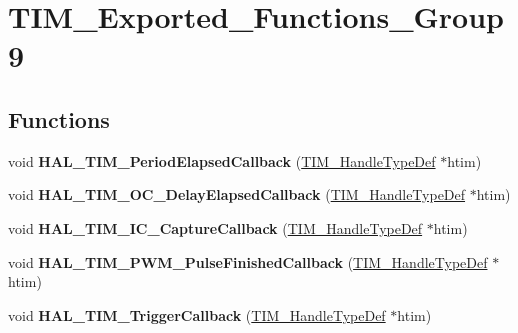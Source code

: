 \hypertarget{group___t_i_m___exported___functions___group9}{\section{T\-I\-M\-\_\-\-Exported\-\_\-\-Functions\-\_\-\-Group9}
\label{group___t_i_m___exported___functions___group9}
}
\subsection*{Functions}
\begin{DoxyCompactItemize}
\item 
\hypertarget{group___t_i_m___exported___functions___group9_ga8a3b0ad512a6e6c6157440b68d395eac}{void {\bfseries H\-A\-L\-\_\-\-T\-I\-M\-\_\-\-Period\-Elapsed\-Callback} (\hyperlink{struct_t_i_m___handle_type_def}{T\-I\-M\-\_\-\-Handle\-Type\-Def} $\ast$htim)}\label{group___t_i_m___exported___functions___group9_ga8a3b0ad512a6e6c6157440b68d395eac}

\item 
\hypertarget{group___t_i_m___exported___functions___group9_ga1fc39499fe9db8b7fb88005e9f107a36}{void {\bfseries H\-A\-L\-\_\-\-T\-I\-M\-\_\-\-O\-C\-\_\-\-Delay\-Elapsed\-Callback} (\hyperlink{struct_t_i_m___handle_type_def}{T\-I\-M\-\_\-\-Handle\-Type\-Def} $\ast$htim)}\label{group___t_i_m___exported___functions___group9_ga1fc39499fe9db8b7fb88005e9f107a36}

\item 
\hypertarget{group___t_i_m___exported___functions___group9_ga77a2401a35ddd9bd0b8fc28331b81381}{void {\bfseries H\-A\-L\-\_\-\-T\-I\-M\-\_\-\-I\-C\-\_\-\-Capture\-Callback} (\hyperlink{struct_t_i_m___handle_type_def}{T\-I\-M\-\_\-\-Handle\-Type\-Def} $\ast$htim)}\label{group___t_i_m___exported___functions___group9_ga77a2401a35ddd9bd0b8fc28331b81381}

\item 
\hypertarget{group___t_i_m___exported___functions___group9_ga07e5fc4d223b16bec2fd6bed547cf91d}{void {\bfseries H\-A\-L\-\_\-\-T\-I\-M\-\_\-\-P\-W\-M\-\_\-\-Pulse\-Finished\-Callback} (\hyperlink{struct_t_i_m___handle_type_def}{T\-I\-M\-\_\-\-Handle\-Type\-Def} $\ast$htim)}\label{group___t_i_m___exported___functions___group9_ga07e5fc4d223b16bec2fd6bed547cf91d}

\item 
\hypertarget{group___t_i_m___exported___functions___group9_ga189577c72b1963671b26820d8161d678}{void {\bfseries H\-A\-L\-\_\-\-T\-I\-M\-\_\-\-Trigger\-Callback} (\hyperlink{struct_t_i_m___handle_type_def}{T\-I\-M\-\_\-\-Handle\-Type\-Def} $\ast$htim)}\label{group___t_i_m___exported___functions___group9_ga189577c72b1963671b26820d8161d678}


\end{DoxyCompactItemize}
